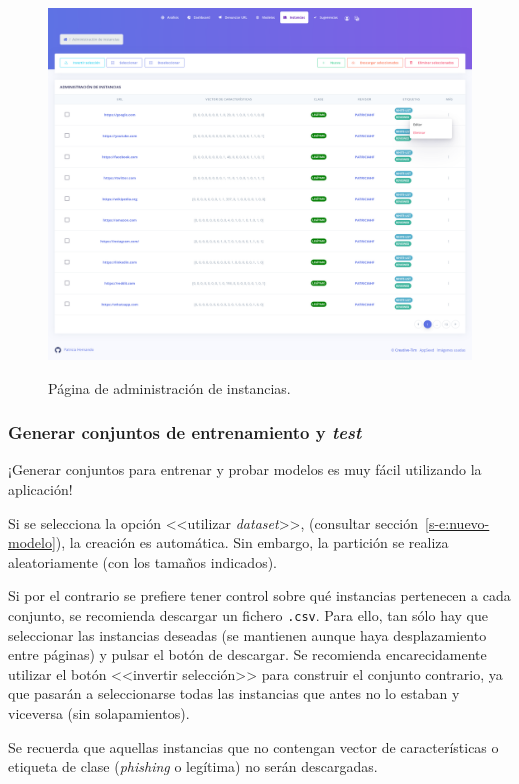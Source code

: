 \begin{figure}[h]
	\caption[Manual de usuario: página de instancias]{Página de administración de instancias.}
	\centering
	\includegraphics[width=\textwidth]{../img/anexos/user_guide/6_instances}
	\label{e-5:instances}
\end{figure}

\subsubsection{Generar conjuntos de entrenamiento y \textit{test}}

¡Generar conjuntos para entrenar y probar modelos es muy fácil utilizando la aplicación!

Si se selecciona la opción <<utilizar \textit{dataset}>>, (consultar sección~\ref{s-e:nuevo-modelo}), la creación es automática. Sin embargo, la partición se realiza aleatoriamente (con los tamaños indicados).

Si por el contrario se prefiere tener control sobre qué instancias pertenecen a cada conjunto, se recomienda descargar un fichero \texttt{.csv}. Para ello, tan sólo hay que seleccionar las instancias deseadas (se mantienen aunque haya desplazamiento entre páginas) y pulsar el botón de descargar. Se recomienda encarecidamente utilizar el botón <<invertir selección>> para construir el conjunto contrario, ya que pasarán a seleccionarse todas las instancias que antes no lo estaban y viceversa (sin solapamientos).

Se recuerda que aquellas instancias que no contengan vector de características o etiqueta de clase (\textit{phishing} o legítima) no serán descargadas.

